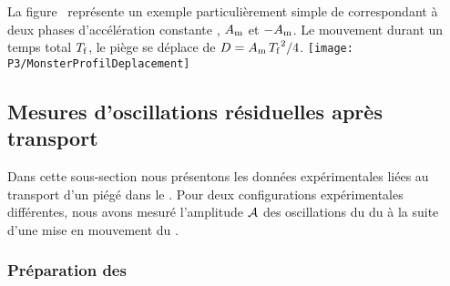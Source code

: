 La figure~ représente un exemple particulièrement simple de \pacc correspondant à deux phases d'accélération constante%
%
, $A_{\rm m}$ et $-A_{\rm m}$.
Le mouvement durant un temps total ${T_{\rm f}}$, le piège se déplace de ${D}=A_{\rm m}\,{{{T_{\rm f}}^2} / {4}}$.%
%
%
\bfighs
\texttt{[image: P3/MonsterProfilDeplacement]}
\label{fig:ProfilDeplacement}
\efigh


\casse

\RetireLigne
\RetireLigne

\subsection{Mesures d'oscillations résiduelles après transport}
Dans cette sous-section nous présentons les données expérimentales liées au transport d'un \n piégé dans le \fld.
Pour deux configurations expérimentales différentes, nous avons mesuré l'amplitude ${\mathcal{A}}$ %
%
 des oscillations du \cdm du \n à la suite d'une mise en mouvement du \pd.
 
 
\subsubsection{Préparation des \nats}

